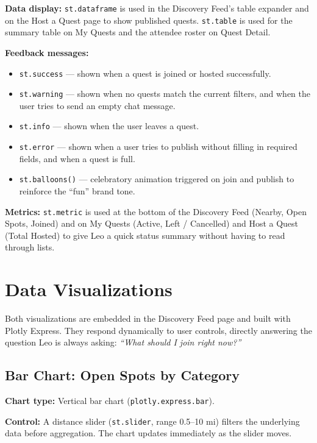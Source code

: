 \documentclass[11pt]{article}
\begin{document}
\textbf{Data display:} \texttt{st.dataframe} is used in the Discovery Feed's table expander and on the Host a Quest page to show published quests. \texttt{st.table} is used for the summary table on My Quests and the attendee roster on Quest Detail.

\textbf{Feedback messages:}
\begin{itemize}[nosep]
    \item \texttt{st.success} --- shown when a quest is joined or hosted successfully.
    \item \texttt{st.warning} --- shown when no quests match the current filters, and when the user tries to send an empty chat message.
    \item \texttt{st.info} --- shown when the user leaves a quest.
    \item \texttt{st.error} --- shown when a user tries to publish without filling in required fields, and when a quest is full.
    \item \texttt{st.balloons()} --- celebratory animation triggered on join and publish to reinforce the ``fun'' brand tone.
\end{itemize}

\textbf{Metrics:} \texttt{st.metric} is used at the bottom of the Discovery Feed (Nearby, Open Spots, Joined) and on My Quests (Active, Left / Cancelled) and Host a Quest (Total Hosted) to give Leo a quick status summary without having to read through lists.

\section{Data Visualizations}

Both visualizations are embedded in the Discovery Feed page and built with Plotly Express. They respond dynamically to user controls, directly answering the question Leo is always asking: \textit{``What should I join right now?''}

\subsection{Bar Chart: Open Spots by Category}

\textbf{Chart type:} Vertical bar chart (\texttt{plotly.express.bar}).

\textbf{Control:} A distance slider (\texttt{st.slider}, range 0.5--10 mi) filters the underlying data before aggregation. The chart updates immediately as the slider moves.
\end{document}
